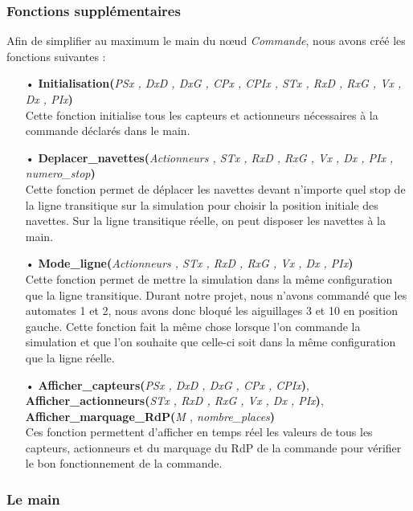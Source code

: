 \documentclass[a4paper,french, titlepage]{book}
\begin{document}
\subsubsection{Fonctions supplémentaires}

Afin de simplifier au maximum le main du nœud \emph{Commande}, nous avons créé les fonctions suivantes :

\begin{itemize}
\item[•] \textbf{Initialisation(}\emph{PSx , DxD , DxG , CPx , CPIx , STx , RxD , RxG , Vx , Dx , PIx}\textbf{)}\\
Cette fonction initialise tous les capteurs et actionneurs nécessaires à la commande déclarés dans le main.
\item[ ] 
\item[•] \textbf{Deplacer\_navettes(}\emph{Actionneurs , STx , RxD , RxG , Vx , Dx , PIx , numero\_stop}\textbf{)}\\
Cette fonction permet de déplacer les navettes devant n'importe quel stop de la ligne transitique sur la simulation pour choisir la position initiale des navettes. Sur la ligne transitique réelle, on peut disposer les navettes à la main.
\item[ ] 
\item[•] \textbf{Mode\_ligne(}\emph{Actionneurs , STx , RxD , RxG , Vx , Dx , PIx}\textbf{)}\\
Cette fonction permet de mettre la simulation dans la même configuration que la ligne transitique. Durant notre projet, nous n'avons commandé que les automates 1 et 2, nous avons donc bloqué les aiguillages 3 et 10 en position gauche. Cette fonction fait la même chose lorsque l'on commande la simulation et que l'on souhaite que celle-ci soit dans la même configuration que la ligne réelle.
\item[ ] 
\item[•] \textbf{Afficher\_capteurs(}\emph{PSx , DxD , DxG , CPx , CPIx}\textbf{)}, \textbf{Afficher\_actionneurs(}\emph{STx , RxD , RxG , Vx , Dx , PIx}\textbf{)}, \textbf{Afficher\_marquage\_RdP(}\emph{M , nombre\_places}\textbf{)}\\ 
Ces fonction permettent d'afficher en temps réel les valeurs de tous les capteurs, actionneurs et du marquage du RdP de la commande pour vérifier le bon fonctionnement de la commande.
\end{itemize}

\subsubsection{Le main}
\end{document}

